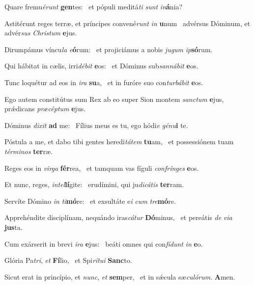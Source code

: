 \item Quare fremu\textit{érunt} \textbf{gen}tes:~\psstar{} et pópuli meditá\textit{ti} \textit{sunt} \textit{in}\textbf{á}nia?
\item Astitérunt reges terræ, et príncipes convené\textit{runt} \textit{in} \textbf{u}num~\psstar{} advérsus Dóminum, et advér\textit{sus} \textit{Christum} \textbf{e}jus.
\item Dirumpámus víncu\textit{la} \textit{e}\textbf{ó}rum:~\psstar{} et projiciámus a nobis \textit{jugum} \textit{ip}\textbf{só}rum.
\item Qui hábitat in cælis, irri\textit{débit} \textbf{e}os:~\psstar{} et Dóminus sub\textit{sannábit} \textbf{e}os.
\item Tunc loquétur ad eos in \textit{ira} \textbf{su}a,~\psstar{} et in furóre suo con\textit{turbábit} \textbf{e}os.
\item Ego autem constitútus sum Rex ab eo super Sion montem \textit{sanctum} \textbf{e}jus,~\psstar{} prǽdicans \textit{præcéptum} \textbf{e}jus.
\item Dóminus \textit{dixit} \textbf{ad} me:~\psstar{} Fílius meus es tu, ego hódi\textit{e} \textit{génu}\textbf{i} te.
\item Póstula a me, et dabo tibi gentes heredi\textit{tátem} \textbf{tu}am,~\psstar{} et possessiónem tuam \textit{términos} \textbf{ter}ræ.
\item Reges eos in \textit{virga} \textbf{fér}rea,~\psstar{} et tamquam vas fíguli \textit{confrínges} \textbf{e}os.
\item Et nunc, reges, \textit{intel}\textbf{lí}gite:~\psstar{} erudímini, qui ju\textit{dicátis} \textbf{ter}ram.
\item Servíte Dómino \textit{in} \textit{ti}\textbf{mó}re:~\psstar{} et exsultáte e\textit{i} \textit{cum} \textit{tre}\textbf{mó}re.
\item Apprehéndite disciplínam, nequándo iras\textit{cátur} \textbf{Dó}minus,~\psstar{} et pereátis \textit{de} \textit{via} \textbf{jus}ta.
\item Cum exárserit in brevi \textit{ira} \textbf{e}jus:~\psstar{} beáti omnes qui con\textit{fídunt} \textit{in} \textbf{e}o.
\item Glória Pa\textit{tri}, \textit{et} \textbf{Fí}lio,~\psstar{} et Spi\textit{rítui} \textbf{Sanc}to.
\item Sicut erat in princípio, et \textit{nunc}, \textit{et} \textbf{sem}per,~\psstar{} et in sǽcula sæ\textit{culórum}. \textbf{A}men.
